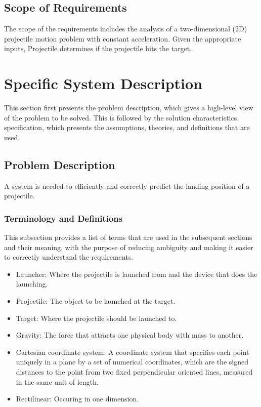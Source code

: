 \documentclass[12pt]{article}
\begin{document}
\subsection{Scope of Requirements}
\label{Sec:ReqsScope}
The scope of the requirements includes the analysis of a two-dimensional (2D) projectile motion problem with constant acceleration. Given the appropriate inputs, Projectile determines if the projectile hits the target.
\section{Specific System Description}
\label{Sec:SpecSystDesc}
This section first presents the problem description, which gives a high-level view of the problem to be solved. This is followed by the solution characteristics specification, which presents the assumptions, theories, and definitions that are used.
\subsection{Problem Description}
\label{Sec:ProbDesc}
A system is needed to efficiently and correctly predict the landing position of a projectile.
\subsubsection{Terminology and Definitions}
\label{Sec:TermDefs}
This subsection provides a list of terms that are used in the subsequent sections and their meaning, with the purpose of reducing ambiguity and making it easier to correctly understand the requirements.
\begin{itemize}
\item{Launcher: Where the projectile is launched from and the device that does the launching.}
\item{Projectile: The object to be launched at the target.}
\item{Target: Where the projectile should be launched to.}
\item{Gravity: The force that attracts one physical body with mass to another.}
\item{Cartesian coordinate system: A coordinate system that specifies each point uniquely in a plane by a set of numerical coordinates, which are the signed distances to the point from two fixed perpendicular oriented lines, measured in the same unit of length.}
\item{Rectilinear: Occuring in one dimension.}
\end{itemize}
\end{document}
